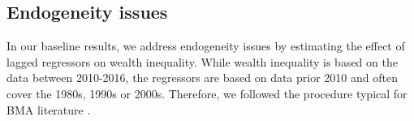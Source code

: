 \documentclass[a4paper,11pt]{article}
\begin{document}


\clearpage

\subsection{Endogeneity issues}
In our baseline results, we address endogeneity issues by estimating the effect of lagged regressors on wealth inequality. While wealth inequality is based on the data between 2010-2016, the regressors are based on data prior 2010 and often cover the 1980s, 1990s or 2000s. Therefore, we followed the procedure typical for BMA literature \citep{christofides,feldkircherjimf,hasan2016}.  
\end{document}
